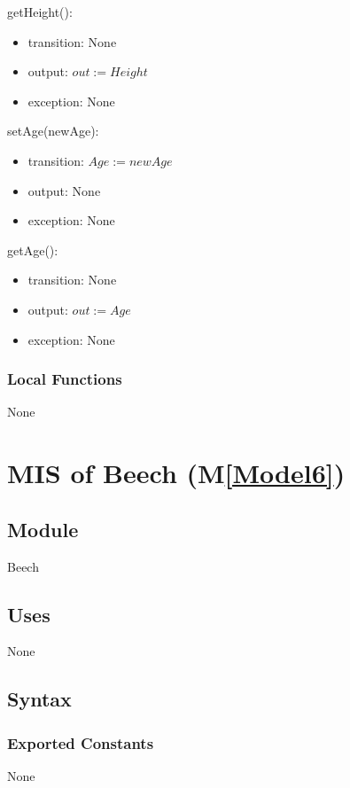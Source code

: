 \documentclass[12pt, titlepage]{article}
\newcommand{\mref}[1]{M\ref{#1}}
\begin{document}
\noindent getHeight():
\begin{itemize}
\item transition: None
\item output: $\mathit{out := Height}$
\item exception: None
\end{itemize}
\noindent setAge(newAge):
\begin{itemize}
\item transition: $\mathit{Age := newAge}$
\item output: None
\item exception: None
\end{itemize}
\noindent getAge():
\begin{itemize}
\item transition: None
\item output: $\mathit{out := Age}$
\item exception: None
\end{itemize}

\subsubsection{Local Functions}
None

\newpage

\renewcommand{\tn}{Beech }
\renewcommand{\tmn}{Beech}
\renewcommand{\constn}{Beech}

\section{MIS of \tn (\mref{Model6})}

\subsection{Module}
\tmn

\subsection{Uses}
None

\subsection{Syntax}
\subsubsection{Exported Constants}
None
\end{document}
